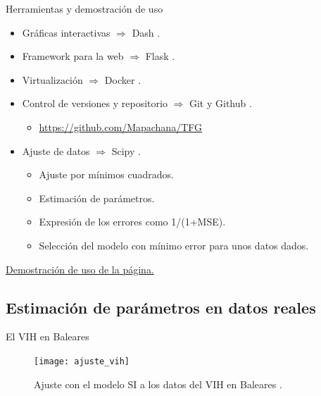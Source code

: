 \begin{frame}{Herramientas y demostración de uso}

    \begin{itemize}
        \item Gráficas interactivas $\Rightarrow$ Dash \cite{dash}.
        \pause
        \item Framework para la web $\Rightarrow$ Flask \cite{flask}.
        \pause
        \item Virtualización $\Rightarrow$ Docker \cite{docker}.
        \pause
        \item Control de versiones y repositorio $\Rightarrow$ Git y Github \cite{git}.
        \begin{itemize}
            \item \href{https://github.com/Mapachana/TFG}{https://github.com/Mapachana/TFG}
        \end{itemize}
        \pause
        \item Ajuste de datos $\Rightarrow$ Scipy \cite{scipy_curvefit}.
        \begin{itemize}
            \item Ajuste por mínimos cuadrados.
            \item Estimación de parámetros.
            \item Expresión de los errores como 1/(1+MSE).
            \item Selección del modelo con mínimo error para unos datos dados.
        \end{itemize}
    \end{itemize}

    \pause

    \href{run:./demo_plotsir.mkv}{Demostración de uso de la página.}

\end{frame}


\subsection{Estimación de parámetros en datos reales}


\begin{frame}{El VIH en Baleares}

    \begin{figure}
        \begin{center}
        \caption{Ajuste con el modelo SI a los datos del VIH en Baleares \cite{datos_vih}.}
        \label{ajuste_vih}
        \texttt{[image: ajuste\_vih]}
        \end{center}
        \end{figure}
\end{frame}


